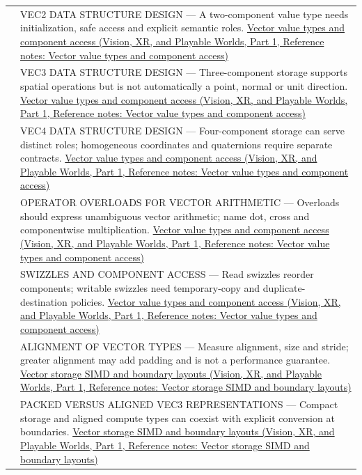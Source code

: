 {\begin{longtable}[]{@{}
  >{\raggedright\arraybackslash}p{}
  >{\raggedright\arraybackslash}p{}@{}}
588 & VEC2 DATA STRUCTURE DESIGN --- A two-component value type needs initialization, safe access and explicit semantic roles. \href{../07-Vision-XR-and-Playable-Worlds-P01/main.pdf\#nameddest=appendix-37a39984ba66}{Vector value types and component access (Vision, XR, and Playable Worlds, Part 1, Reference notes: Vector value types and component access)} \\
589 & VEC3 DATA STRUCTURE DESIGN --- Three-component storage supports spatial operations but is not automatically a point, normal or unit direction. \href{../07-Vision-XR-and-Playable-Worlds-P01/main.pdf\#nameddest=appendix-37a39984ba66}{Vector value types and component access (Vision, XR, and Playable Worlds, Part 1, Reference notes: Vector value types and component access)} \\
590 & VEC4 DATA STRUCTURE DESIGN --- Four-component storage can serve distinct roles; homogeneous coordinates and quaternions require separate contracts. \href{../07-Vision-XR-and-Playable-Worlds-P01/main.pdf\#nameddest=appendix-37a39984ba66}{Vector value types and component access (Vision, XR, and Playable Worlds, Part 1, Reference notes: Vector value types and component access)} \\
591 & OPERATOR OVERLOADS FOR VECTOR ARITHMETIC --- Overloads should express unambiguous vector arithmetic; name dot, cross and componentwise multiplication. \href{../07-Vision-XR-and-Playable-Worlds-P01/main.pdf\#nameddest=appendix-37a39984ba66}{Vector value types and component access (Vision, XR, and Playable Worlds, Part 1, Reference notes: Vector value types and component access)} \\
592 & SWIZZLES AND COMPONENT ACCESS --- Read swizzles reorder components; writable swizzles need temporary-copy and duplicate-destination policies. \href{../07-Vision-XR-and-Playable-Worlds-P01/main.pdf\#nameddest=appendix-37a39984ba66}{Vector value types and component access (Vision, XR, and Playable Worlds, Part 1, Reference notes: Vector value types and component access)} \\
593 & ALIGNMENT OF VECTOR TYPES --- Measure alignment, size and stride; greater alignment may add padding and is not a performance guarantee. \href{../07-Vision-XR-and-Playable-Worlds-P01/main.pdf\#nameddest=appendix-26bf6bf2fb8b}{Vector storage SIMD and boundary layouts (Vision, XR, and Playable Worlds, Part 1, Reference notes: Vector storage SIMD and boundary layouts)} \\
594 & PACKED VERSUS ALIGNED VEC3 REPRESENTATIONS --- Compact storage and aligned compute types can coexist with explicit conversion at boundaries. \href{../07-Vision-XR-and-Playable-Worlds-P01/main.pdf\#nameddest=appendix-26bf6bf2fb8b}{Vector storage SIMD and boundary layouts (Vision, XR, and Playable Worlds, Part 1, Reference notes: Vector storage SIMD and boundary layouts)} \\

\end{longtable}}
